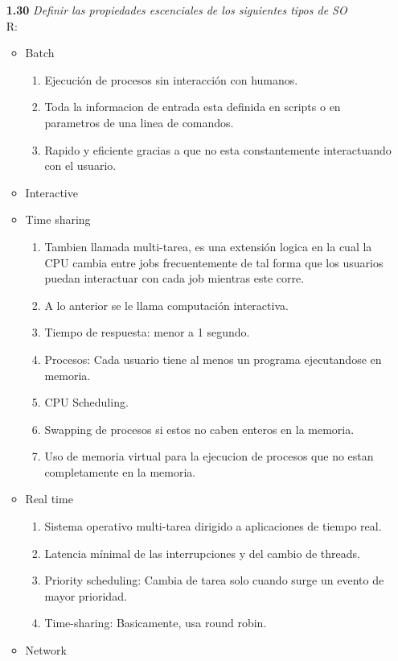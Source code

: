 \begin{itemize}
\item[\textbf{1.30}] \emph{Definir las propiedades escenciales de los
siguientes tipos de SO}\\
R:
	\begin{itemize}
		\item Batch
		\begin{enumerate}
			\item Ejecuci\'on de procesos sin interacci\'on con humanos.
			\item Toda la informacion de entrada esta definida en scripts o en parametros de una linea de comandos.
			\item Rapido y eficiente gracias a que no esta constantemente interactuando con el usuario.
		\end{enumerate}	
		\item Interactive
		\item Time sharing	
		\begin{enumerate}
			\item	Tambien llamada multi-tarea, es una extensi\'on logica en la cual la CPU cambia entre jobs frecuentemente de tal forma que los usuarios puedan interactuar con cada job mientras este corre.
			\item A lo anterior se le llama computaci\'on interactiva.
			\item Tiempo de respuesta: menor a 1 segundo.
			\item Procesos: Cada usuario tiene al menos un programa ejecutandose en memoria.
			\item CPU Scheduling.
			\item Swapping de procesos si estos no caben enteros en la memoria.
			\item Uso de memoria virtual para la ejecucion de procesos que no estan completamente en la memoria.
		\end{enumerate}
		\item Real time
		\begin{enumerate}
			\item Sistema operativo multi-tarea dirigido a aplicaciones de tiempo real. 
			\item Latencia m\'inimal de las interrupciones y del cambio de threads.
			\item Priority scheduling: Cambia de tarea solo cuando surge un evento de mayor prioridad.
			\item Time-sharing: Basicamente, usa round robin. 
		\end{enumerate}
		\item Network

\end{itemize}
\end{itemize}
